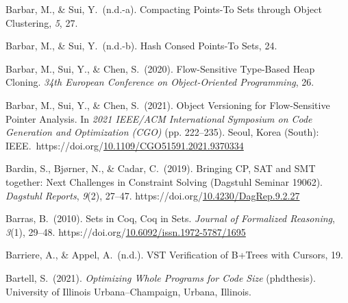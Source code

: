 \documentclass[12pt,twoside]{article}
\begin{document}
{\begin{thebibliography}{1079}
\mdbibitemlabel{}Barbar, M., \& Sui, Y.~(n.d.-a). Compacting Points-To Sets through Object Clustering, \emph{5}, 27.%

\mdbibitemlabel{}Barbar, M., \& Sui, Y.~(n.d.-b). Hash Consed Points-To Sets, 24.%

\mdbibitemlabel{}Barbar, M., Sui, Y., \& Chen, S.~(2020). Flow-Sensitive Type-Based Heap Cloning. \emph{34th European Conference on Object-Oriented Programming}, 26.%

\mdbibitemlabel{}Barbar, M., Sui, Y., \& Chen, S.~(2021). Object Versioning for Flow-Sensitive Pointer Analysis. In \emph{2021 IEEE/ACM International Symposium on Code Generation and Optimization (CGO)} (pp. 222–235). Seoul, Korea (South): IEEE.~https://doi.org/\href{https://dx.doi.org/10.1109/CGO51591.2021.9370334}{10.1109/CGO51591.2021.9370334}%

\mdbibitemlabel{}Bardin, S., Bjørner, N., \& Cadar, C.~(2019). Bringing CP, SAT and SMT together: Next Challenges in Constraint Solving (Dagstuhl Seminar 19062). \emph{Dagstuhl Reports}, \emph{9}(2), 27–47. https://doi.org/\href{https://dx.doi.org/10.4230/DagRep.9.2.27}{10.4230/DagRep.9.2.27}%

\mdbibitemlabel{}Barras, B.~(2010). Sets in Coq, Coq in Sets. \emph{Journal of Formalized Reasoning}, \emph{3}(1), 29–48. https://doi.org/\href{https://dx.doi.org/10.6092/issn.1972-5787/1695}{10.6092/issn.1972-5787/1695}%

\mdbibitemlabel{}Barriere, A., \& Appel, A.~(n.d.). VST Veriﬁcation of B+Trees with Cursors, 19.%

\mdbibitemlabel{}Bartell, S.~(2021). \emph{Optimizing Whole Programs for Code Size} (phdthesis). University of Illinois Urbana–Champaign, Urbana, Illinois.%


\end{thebibliography}}
\end{document}
